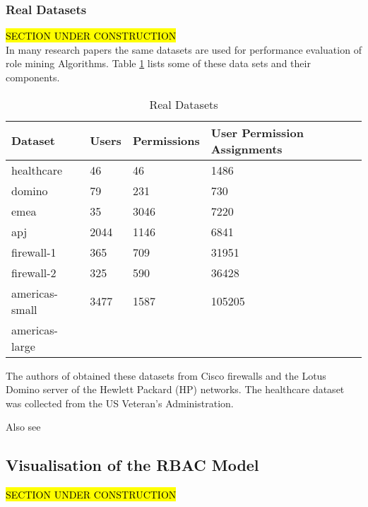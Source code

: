 \subsubsection{Real Datasets}
\hl{SECTION UNDER CONSTRUCTION}\\
In many research papers the same datasets are used for performance evaluation of role mining Algorithms. Table \ref{tab:realDatasets} lists some of these data sets and their components.
\begin{table}[ht]
    \centering
    \begin{tabular}{|l|l|l|l|}
        \hline
        \rowcolor[HTML]{EFEFEF} 
        \textbf{Dataset} & \textbf{Users} & \textbf{Permissions} & \textbf{User Permission Assignments} \\ \hline
        healthcare       & 46             & 46                   & 1486                                 \\ \hline
        domino           & 79             & 231                  & 730                                  \\ \hline
        emea             & 35             & 3046                 & 7220                                 \\ \hline
        apj              & 2044           & 1146                 & 6841                                 \\ \hline
        firewall-1       & 365            & 709                  & 31951                                \\ \hline
        firewall-2       & 325            & 590                  & 36428                                \\ \hline
        americas-small   & 3477           & 1587                 & 105205                               \\ \hline
        americas-large   &                &                      &                                      \\ \hline
    \end{tabular}
    \caption{Real Datasets}
    \label{tab:realDatasets}
\end{table}

The authors of \cite{Ene} obtained these datasets from Cisco firewalls and the Lotus Domino server of the Hewlett Packard (HP) networks. The healthcare dataset was collected from the US Veteran’s Administration.

Also see \cite{Xu}

\subsection{Visualisation of the RBAC Model}
\hl{SECTION UNDER CONSTRUCTION}\\

